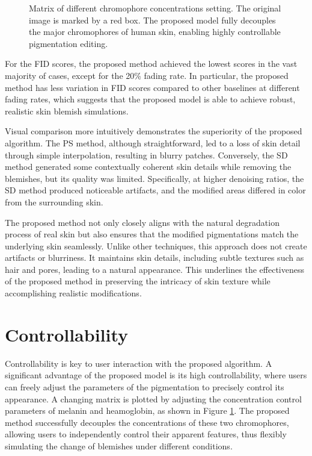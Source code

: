 \begin{spacing}{1.5}
\begin{figure}[t!]
    \caption{Matrix of different chromophore concentrations setting. The original image is marked by a red box. The proposed model fully decouples the major chromophores of human skin, enabling highly controllable pigmentation editing.}
    \label{fig:matrix}
\end{figure}
For the FID scores, the proposed method achieved the lowest scores in the vast majority of cases, except for the 20\% fading rate. In particular, the proposed method has less variation in FID scores compared to other baselines at different fading rates, which suggests that the proposed model is able to achieve robust, realistic skin blemish simulations.

Visual comparison more intuitively demonstrates the superiority of the proposed algorithm. The PS method, although straightforward, led to a loss of skin detail through simple interpolation, resulting in blurry patches. Conversely, the SD method generated some contextually coherent skin details while removing the blemishes, but its quality was limited. Specifically, at higher denoising ratios, the SD method produced noticeable artifacts, and the modified areas differed in color from the surrounding skin.

The proposed method not only closely aligns with the natural degradation process of real skin but also ensures that the modified pigmentations match the underlying skin seamlessly. Unlike other techniques, this approach does not create artifacts or blurriness. It maintains skin details, including subtle textures such as hair and pores, leading to a natural appearance. This underlines the effectiveness of the proposed method in preserving the intricacy of skin texture while accomplishing realistic modifications.
\section{Controllability}
Controllability is key to user interaction with the proposed algorithm. A significant advantage of the proposed model is its high controllability, where users can freely adjust the parameters of the pigmentation to precisely control its appearance.
A changing matrix is plotted by adjusting the concentration control parameters of melanin and heamoglobin, as shown in Figure \ref{fig:matrix}. The proposed method successfully decouples the concentrations of these two chromophores, allowing users to independently control their apparent features, thus flexibly simulating the change of blemishes under different conditions.

\end{spacing}
